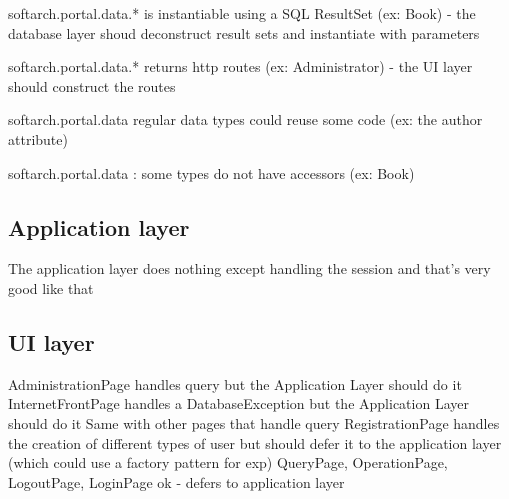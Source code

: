 softarch.portal.data.* is instantiable using a SQL ResultSet (ex: Book) - the database layer shoud deconstruct result sets and instantiate with parameters

softarch.portal.data.* returns http routes (ex: Administrator) - the UI layer should construct the routes

softarch.portal.data regular data types could reuse some code (ex: the author attribute)

softarch.portal.data : some types do not have accessors (ex: Book)

\subsection{Application layer}

The application layer does nothing except handling the session and that's very good like that

\subsection{UI layer}

AdministrationPage handles query but the Application Layer should do it InternetFrontPage handles a DatabaseException but the Application Layer should do it Same with other pages that handle query RegistrationPage handles the creation of different types of user but should defer it to the application layer (which could use a factory pattern for exp) QueryPage, OperationPage, LogoutPage, LoginPage ok - defers to application layer
